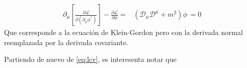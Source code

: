 \begin{align}
  \partial_{\mu} \left[ \frac{\partial \mathcal{L}}{\partial \left( \partial_{\mu}\phi^{*} \right)} \right]-\frac{\partial \mathcal{L}}{\partial \phi}=&
 \left(\mathcal{D}_{\mu}\mathcal{D}^{\mu}+m^2  \right)\phi\,=0
\end{align}
Que corresponde a la ecuación de Klein-Gordon pero con la derivada normal reemplazada por la derivada covariante.

Partiendo de nuevo de \ref{eq:lcv}, es interesenta notar que





